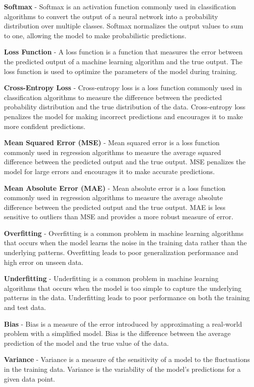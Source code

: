 \textbf{Softmax} - Softmax is an activation function commonly used in classification algorithms to convert the output of a neural network into a probability distribution over multiple classes. Softmax normalizes the output values to sum to one, allowing the model to make probabilistic predictions.

\textbf{Loss Function} - A loss function is a function that measures the error between the predicted output of a machine learning algorithm and the true output. The loss function is used to optimize the parameters of the model during training.

\textbf{Cross-Entropy Loss} - Cross-entropy loss is a loss function commonly used in classification algorithms to measure the difference between the predicted probability distribution and the true distribution of the data. Cross-entropy loss penalizes the model for making incorrect predictions and encourages it to make more confident predictions.

\textbf{Mean Squared Error (MSE)} - Mean squared error is a loss function commonly used in regression algorithms to measure the average squared difference between the predicted output and the true output. MSE penalizes the model for large errors and encourages it to make accurate predictions.

\textbf{Mean Absolute Error (MAE)} - Mean absolute error is a loss function commonly used in regression algorithms to measure the average absolute difference between the predicted output and the true output. MAE is less sensitive to outliers than MSE and provides a more robust measure of error.

\textbf{Overfitting} - Overfitting is a common problem in machine learning algorithms that occurs when the model learns the noise in the training data rather than the underlying patterns. Overfitting leads to poor generalization performance and high error on unseen data.

\textbf{Underfitting} - Underfitting is a common problem in machine learning algorithms that occurs when the model is too simple to capture the underlying patterns in the data. Underfitting leads to poor performance on both the training and test data.

\textbf{Bias} - Bias is a measure of the error introduced by approximating a real-world problem with a simplified model. Bias is the difference between the average prediction of the model and the true value of the data.

\textbf{Variance} - Variance is a measure of the sensitivity of a model to the fluctuations in the training data. Variance is the variability of the model's predictions for a given data point.


